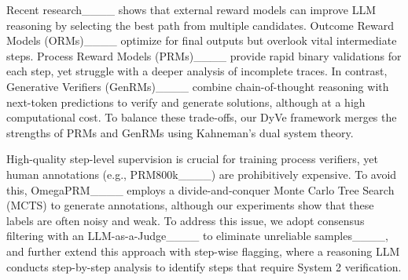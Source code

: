 Recent research____ shows that external reward models can improve LLM reasoning by selecting the best path from multiple candidates. Outcome Reward Models (ORMs)____ optimize for final outputs but overlook vital intermediate steps. Process Reward Models (PRMs)____ provide rapid binary validations for each step, yet struggle with a deeper analysis of incomplete traces. In contrast, Generative Verifiers (GenRMs)____ combine chain-of-thought reasoning with next-token predictions to verify and generate solutions, although at a high computational cost. To balance these trade-offs, our DyVe framework merges the strengths of PRMs and GenRMs using Kahneman's dual system theory.



High-quality step-level supervision is crucial for training process verifiers, yet human annotations (e.g., PRM800k____) are prohibitively expensive. To avoid this, OmegaPRM____ employs a divide-and-conquer Monte Carlo Tree Search (MCTS) to generate annotations, although our experiments show that these labels are often noisy and weak. To address this issue, we adopt consensus filtering with an LLM-as-a-Judge____ to eliminate unreliable samples____, and further extend this approach with step-wise flagging, where a reasoning LLM conducts step-by-step analysis to identify steps that require System 2 verification.



